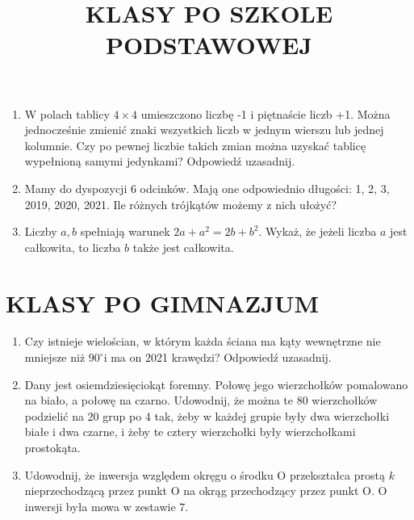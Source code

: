 \documentclass[10pt]{article}
\title{KLASY PO SZKOLE PODSTAWOWEJ }
\author{}
\date{}
\begin{document}
\maketitle
\begin{enumerate}
  \item W polach tablicy \(4 \times 4\) umieszczono liczbę -1 i piętnaście liczb +1. Można jednocześnie zmienić znaki wszystkich liczb w jednym wierszu lub jednej kolumnie. Czy po pewnej liczbie takich zmian można uzyskać tablicę wypełnioną samymi jedynkami? Odpowiedź uzasadnij.
  \item Mamy do dyspozycji 6 odcinków. Mają one odpowiednio długości: 1, 2, 3, 2019, 2020, 2021. Ile różnych trójkątów możemy z nich ułożyć?
  \item Liczby \(a, b\) spełniają warunek \(2 a+a^{2}=2 b+b^{2}\). Wykaż, że jeżeli liczba \(a\) jest całkowita, to liczba \(b\) także jest całkowita.
\end{enumerate}

\section*{KLASY PO GIMNAZJUM}
\begin{enumerate}
  \item Czy istnieje wielościan, w którym każda ściana ma kąty wewnętrzne nie mniejsze niż \(90^{\circ} \mathrm{i}\) ma on 2021 krawędzi? Odpowiedź uzasadnij.
  \item Dany jest osiemdziesięciokąt foremny. Połowę jego wierzchołków pomalowano na biało, a połowę na czarno. Udowodnij, że można te 80 wierzchołków podzielić na 20 grup po 4 tak, żeby w każdej grupie były dwa wierzchołki białe i dwa czarne, i żeby te cztery wierzchołki były wierzchołkami prostokąta.
  \item Udowodnij, że inwersja względem okręgu o środku O przekształca prostą \(k\) nieprzechodzącą przez punkt O na okrąg przechodzący przez punkt O. O inwersji była mowa w zestawie 7.
\end{enumerate}
\end{document}
